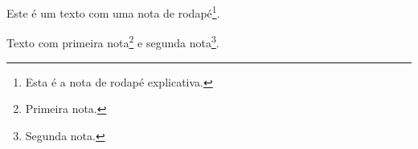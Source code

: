 
Este é um texto com uma nota de rodapé\footnote{Esta é a nota de rodapé explicativa.}.

Texto com primeira nota\footnote{Primeira nota.} e segunda nota\footnote{Segunda nota.}.



